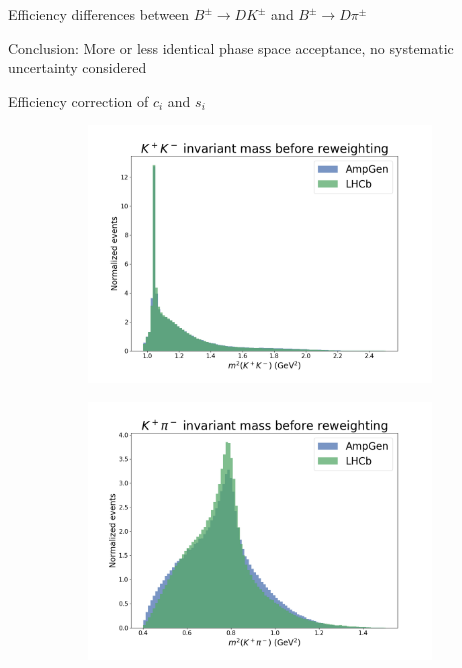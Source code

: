 \documentclass{beamer}
\begin{document}
\begin{frame}{Efficiency differences between $B^\pm\to DK^\pm$ and $B^\pm\to D\pi^\pm$}
\begin{figure}
\begin{subfigure}{0.33\textwidth}
    \end{subfigure}
  \end{figure}
  \begin{center}
    Conclusion: More or less identical phase space acceptance, no systematic uncertainty considered
  \end{center}
\end{frame}  

\begin{frame}{Efficiency correction of $c_i$ and $s_i$}
  \begin{figure}
    \centering
    \begin{subfigure}{0.33\textwidth}
      \includegraphics[width = 1.0\textwidth]{Plots/s01_BeforeReweighting.png}
    \end{subfigure}%
    \begin{subfigure}{0.33\textwidth}
      \includegraphics[width = 1.0\textwidth]{Plots/s03_BeforeReweighting.png}

\end{subfigure}
\end{figure}
\end{frame}
\end{document}
